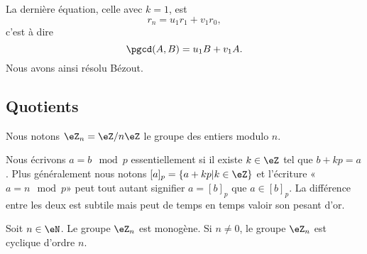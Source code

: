 La dernière équation, celle avec \( k=1\), est
\begin{equation}
    r_n=u_1r_1+v_1r_0,
\end{equation}
c'est à dire
\begin{equation}
    \pgcd(A,B)=u_1B+v_1A.
\end{equation}
Nous avons ainsi résolu Bézout.

\subsection{Quotients}

Nous notons \( \eZ_n=\eZ/n\eZ\) le groupe des entiers modulo \( n\).

Nous écrivons \( a=b\mod p\) essentiellement si il existe \( k\in \eZ\) tel que \( b+kp=a\). Plus généralement nous notons \( [a]_p=\{ a+kp|k\in \eZ \}\) et l'écriture «\( a=n\mod p\)» peut tout autant signifier \( a=[b]_p\) que \( a\in [b]_p\). La différence entre les deux est subtile mais peut de temps en temps valoir son pesant d'or.


\begin{proposition}
    Soit \( n\in\eN\). Le groupe \( \eZ_n\) est monogène. Si \( n\neq 0\), le groupe \( \eZ_n\) est cyclique d'ordre \( n\).
\end{proposition}

